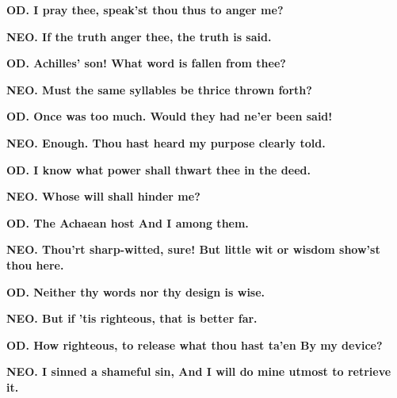 \documentclass[11pt,letter]{book}
\begin{document}
\par \textbf{OD. I pray thee, speak’st thou thus to anger me?}
\par 

\par \textbf{NEO. If the truth anger thee, the truth is said.}
\par 

\par \textbf{OD. Achilles’ son! What word is fallen from thee?}
\par 

\par \textbf{NEO. Must the same syllables be thrice thrown forth?}
\par 

\par \textbf{OD. Once was too much. Would they had ne’er been said!}
\par 

\par \textbf{NEO. Enough. Thou hast heard my purpose clearly told.}
\par 

\par \textbf{OD. I know what power shall thwart thee in the deed.}
\par 

\par \textbf{NEO. Whose will shall hinder me?}
\par 

\par \textbf{OD. The Achaean host And I among them.}
\par 

\par \textbf{NEO. Thou’rt sharp-witted, sure! But little wit or wisdom show’st thou here.}
\par 

\par \textbf{OD. Neither thy words nor thy design is wise.}
\par 

\par \textbf{NEO. But if ’tis righteous, that is better far.}
\par 

\par \textbf{OD. How righteous, to release what thou hast ta’en By my device?}
\par 

\par \textbf{NEO. I sinned a shameful sin, And I will do mine utmost to retrieve it.}
\par 
\end{document}
